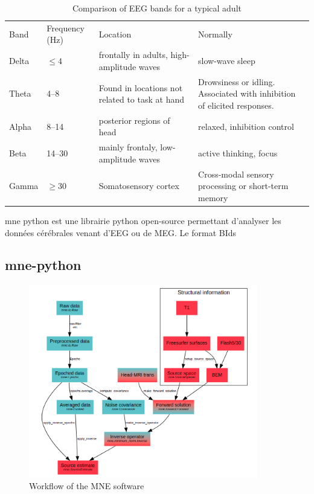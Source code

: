 \begin{table}[ht]
    \caption{Comparison of EEG bands for a typical adult}
    \centering
    \begin{tabular}{@{}| p{1.2cm}|p{2.5cm}| p{4.5cm}|p{4.5cm}| @{}}
        \hline
        Band  & Frequency (Hz) & Location                                       & Normally                                                                \\
        Delta & $\leq  4$            & frontally in adults, high-amplitude waves      & slow-wave sleep                                                         \\
        Theta & 4–8            & Found in locations not related to task at hand & Drowsiness or idling. Associated with inhibition of elicited responses. \\
        Alpha & 8–14           & posterior regions of head                      & relaxed, inhibition control                                             \\
        Beta  & 14–30          & mainly frontaly, low-amplitude waves           & active thinking, focus                                                  \\
        Gamma & $\geq 30$           & Somatosensory cortex                           & Cross-modal sensory processing or short-term memory                     \\
        \hline
    \end{tabular}
    \label{Tab:neural_freq_band}
\end{table}


mne python est une librairie python open-source permettant d'analyser les données cérébrales venant d'EEG ou de MEG. Le format BIds

\subsection{mne-python}


\begin{figure}[h]
    \centering
    \includegraphics[width=10cm]{images_report/workflow_of_the_mne_software.png}
    \caption{Workflow of the MNE software \cite{GramfortEtAl2013a}}
\end{figure}


